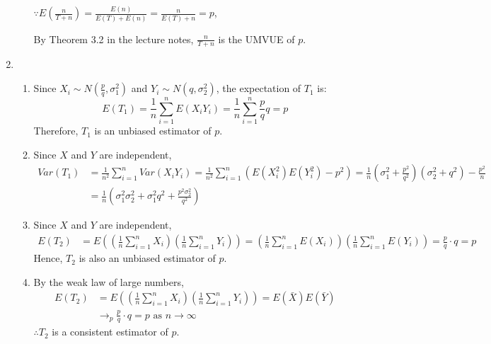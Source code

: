 \documentclass{article}
\begin{document}
\begin{enumerate}
\begin{enumerate}[label=(\roman*)]
    $\because E(\frac{n}{T+n}) = \frac{E(n)}{E(T)+E(n)} = \frac{n}{E(T)+n}=p$,

    By Theorem 3.2 in the lecture notes, $\frac{n}{T+n}$ is the UMVUE of $p$.
    \end{enumerate}

\item
    \begin{enumerate}[label=(\roman*)]
    \item Since $X_i \sim N(\frac{p}{q}, \sigma_1^2)$ and $Y_i \sim N(q, \sigma_2^2)$, the expectation of $T_1$ is:
    \[
    E(T_1) = \frac{1}{n} \sum_{i=1}^n E(X_i Y_i) = \frac{1}{n} \sum_{i=1}^n \frac{p}{q}q = p
    \]
    Therefore, $T_1$ is an unbiased estimator of $p$.

    \item Since $X$ and $Y$ are independent,
    \begin{align*}
    Var(T_1) &= \frac{1}{n^2} \sum_{i=1}^n Var(X_i Y_i) = \frac{1}{n^2} \sum_{i=1}^n \left(E(X_i^2) E(Y_i^2) - p^2 \right) = \frac{1}{n} (\sigma_1^2 + \frac{p^2}{q^2}) (\sigma_2^2 + q^2) - \frac{p^2}{n} \\
    &= \frac{1}{n} \left( \sigma_1^2 \sigma_2^2 + \sigma_1^2 q^2 + \frac{p^2 \sigma_2^2}{q^2}\right)
    \end{align*}

    \item Since $X$ and $Y$ are independent,
    \begin{align*}
    E(T_2) &= E\left( \left( \frac{1}{n} \sum_{i=1}^n X_i \right) \left( \frac{1}{n} \sum_{i=1}^n Y_i \right) \right) = \left(\frac{1}{n} \sum_{i=1}^n E(X_i) \right) \left( \frac{1}{n} \sum_{i=1}^n E(Y_i) \right) = \frac{p}{q} \cdot q = p
    \end{align*}
    Hence, $T_2$ is also an unbiased estimator of $p$.

    \item By the weak law of large numbers,
    \begin{align*}
        E(T_2) &= E\left( \left( \frac{1}{n} \sum_{i=1}^n X_i \right) \left( \frac{1}{n} \sum_{i=1}^n Y_i \right) \right) = E(\bar{X}) E(\bar{Y}) \\
        & \rightarrow_p \frac{p}{q} \cdot q = p \text{ as } n \rightarrow \infty
    \end{align*}
    $\therefore T_2$ is a consistent estimator of $p$.


\end{enumerate}
\end{enumerate}
\end{document}
